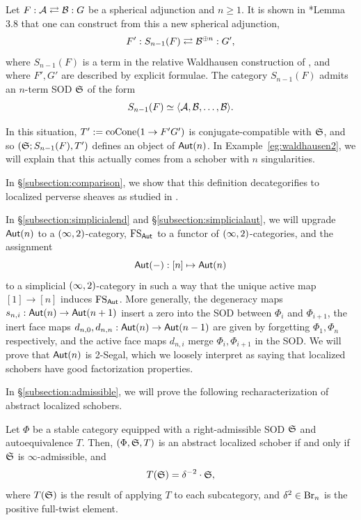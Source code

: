 \begin{eg}\label{eg:waldhausen1}
    Let $F:\mathcal{A}\rightleftarrows \mathcal{B}:G$ be a spherical adjunction and $n\geq 1$. It is shown in \cite{christGinzburgAlgebrasTriangulated2022}*{Lemma 3.8} that one can construct from this a new spherical adjunction,
    \[F':S_{n-1}(F)\rightleftarrows \mathcal{B}^{\oplus n}:G',\]
    where $S_{n-1}(F)$ is a term in the relative Waldhausen construction of \cite{dyckerhoffSphericalAdjunctionsStable2021}, and where $F',G'$ are described by explicit formulae. The category $S_{n-1}(F)$ admits an $n$-term SOD $\mathfrak{S}$ of the form
    \[S_{n-1}(F) \simeq \langle\mathcal{A},\mathcal{B},\dots,\mathcal{B}\rangle.\]

    In this situation, $T' := \operatorname{coCone}(1\to F'G')$ is conjugate-compatible with $\mathfrak{S}$, and so $(\mathfrak{S};S_{n-1}(F),T')$ defines an object of $\mathsf{Aut}(n)$. In Example~\ref{eg:waldhausen2}, we will explain that this actually comes from a schober with $n$ singularities.
\end{eg}

In \S\ref{subsection:comparison}, we show that this definition decategorifies to localized perverse sheaves as studied in \cite{gelfandPerverseSheavesQuivers1996}.

In \S\ref{subsection:simplicialend} and \S\ref{subsection:simplicialaut}, we will upgrade $\mathsf{Aut}(n)$ to a $(\infty,2)$-category, $\operatorname{FS}_{\mathsf{Aut}}$ to a functor of $(\infty,2)$-categories, and the assignment
\[\mathsf{Aut}(-):[n]\mapsto\mathsf{Aut}(n)\]
to a simplicial $(\infty,2)$-category in such a way that the unique active map $[1]\to [n]$ induces $\operatorname{FS}_{\mathsf{Aut}}$. More generally, the degeneracy maps $s_{n,i}:\mathsf{Aut}(n)\to\mathsf{Aut}(n+1)$ insert a zero into the SOD between $\Phi_i$ and $\Phi_{i+1}$, the inert face maps $d_{n,0},d_{n,n}:\mathsf{Aut}(n)\to\mathsf{Aut}(n-1)$ are given by forgetting $\Phi_1,\Phi_n$ respectively, and the active face maps $d_{n,i}$ merge $\Phi_i,\Phi_{i+1}$ in the SOD. We will prove that $\mathsf{Aut}(n)$ is 2-Segal, which we loosely interpret as saying that localized schobers have good factorization properties.

In \S\ref{subsection:admissible}, we will prove the following recharacterization of abstract localized schobers.

\begin{thm}\label{thm:alternate}
    Let $\Phi$ be a stable category equipped with a right-admissible SOD $\mathfrak{S}$ and autoequivalence $T$. Then, $(\Phi,\mathfrak{S},T)$ is an abstract localized schober if and only if $\mathfrak{S}$ is $\infty$-admissible, and
    \[T(\mathfrak{S}) = \delta^{-2}\cdot \mathfrak{S},\]
    where $T(\mathfrak{S})$ is the result of applying $T$ to each subcategory, and $\delta^2 \in\operatorname{Br}_n$ is the positive full-twist element.
\end{thm}

